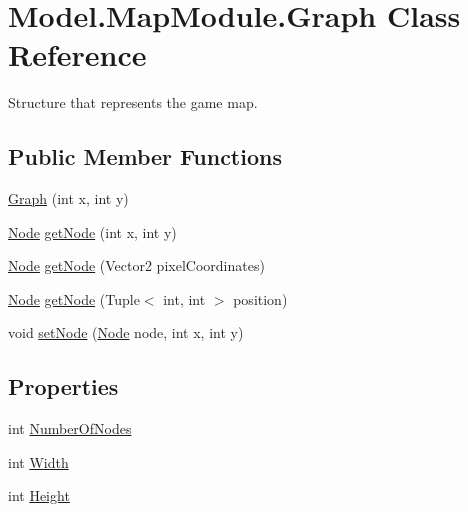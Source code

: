 \hypertarget{class_model_1_1_map_module_1_1_graph}{}\section{Model.\+Map\+Module.\+Graph Class Reference}
\label{class_model_1_1_map_module_1_1_graph}


Structure that represents the game map.  


\subsection*{Public Member Functions}
\begin{DoxyCompactItemize}
\item 
\hyperlink{class_model_1_1_map_module_1_1_graph_a544b5d4f0e27b124634bb2e53de3ce66}{Graph} (int x, int y)
\item 
\hyperlink{class_model_1_1_map_module_1_1_node}{Node} \hyperlink{class_model_1_1_map_module_1_1_graph_a49b627a9b9d37d7e5c2f0f456192ad4c}{get\+Node} (int x, int y)
\item 
\hyperlink{class_model_1_1_map_module_1_1_node}{Node} \hyperlink{class_model_1_1_map_module_1_1_graph_ade10e8a4ae9111f8b0d7ba29c97537c5}{get\+Node} (Vector2 pixel\+Coordinates)
\item 
\hyperlink{class_model_1_1_map_module_1_1_node}{Node} \hyperlink{class_model_1_1_map_module_1_1_graph_a4fa5605aa0de03db00c63308defe2a2d}{get\+Node} (Tuple$<$ int, int $>$ position)
\item 
void \hyperlink{class_model_1_1_map_module_1_1_graph_ada45d04c626638fa7e7d69f3f15b31a9}{set\+Node} (\hyperlink{class_model_1_1_map_module_1_1_node}{Node} node, int x, int y)
\end{DoxyCompactItemize}
\subsection*{Properties}
\begin{DoxyCompactItemize}
\item 
int \hyperlink{class_model_1_1_map_module_1_1_graph_a949cc2946985a51788e917d1a697d6e9}{Number\+Of\+Nodes}
\item 
int \hyperlink{class_model_1_1_map_module_1_1_graph_a62c540735318014678e4adb153ee8c2e}{Width}
\item 
int \hyperlink{class_model_1_1_map_module_1_1_graph_ae86adb2a7093762d93b02f7768194ee5}{Height}
\end{DoxyCompactItemize}


